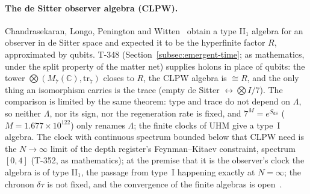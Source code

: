 \paragraph{The de Sitter observer algebra (CLPW).}
Chandrasekaran, Longo, Penington and Witten~\cite{clpw2023} obtain a type II$_1$
algebra for an observer in de Sitter space and expected it to be the hyperfinite
factor $R$, approximated by qubits. T-348 (Section~\ref{subsec:emergent-time};
 as mathematics, under the split property of the matter net) supplies
holons in place of qubits: the tower $\bigotimes(M_7(\mathbb{C}), \mathrm{tr}_7)$
closes to $R$, the CLPW algebra is $\cong R$, and the only thing an isomorphism
carries is the trace (empty de Sitter $\leftrightarrow \bigotimes I/7$). The
comparison is limited by the same theorem: type and trace do not depend on
$\Lambda$, so neither $\Lambda$, nor its sign, nor the regeneration rate is fixed,
and $7^M = e^{S_{\mathrm{dS}}}$ ($M = 1.677 \times 10^{122}$) only renames $\Lambda$;
the finite clocks of UHM give a type~I algebra. The clock with continuous
spectrum bounded below that CLPW need is the $N \to \infty$ limit of the depth
register's Feynman--Kitaev constraint, spectrum $[0,4]$ (T-352,  as
mathematics); at the premise that it is the observer's clock the algebra is of
type II$_1$, the passage from type~I happening exactly at $N = \infty$; the
chronon $\delta\tau$ is not fixed, and the convergence of the finite algebras is
open~.

